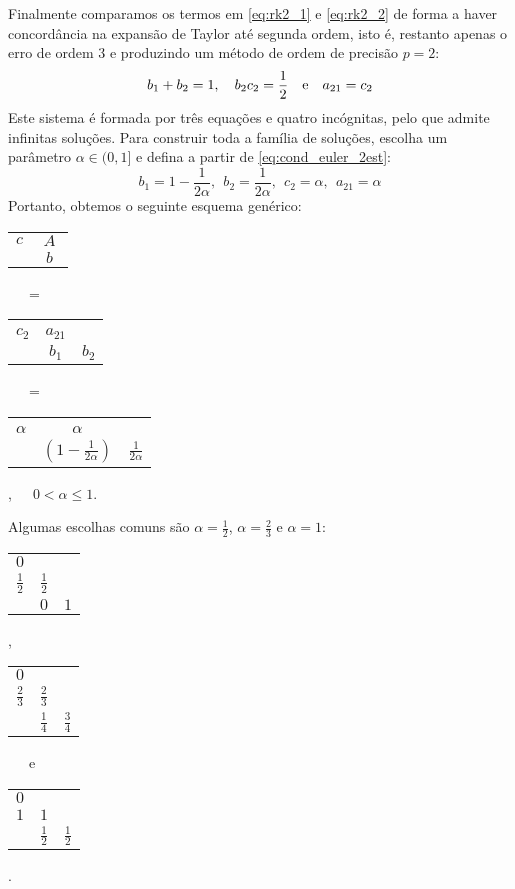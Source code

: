 Finalmente comparamos os termos em \eqref{eq:rk2_1} e \eqref{eq:rk2_2} de forma a haver concordância na expansão de Taylor até segunda ordem, isto é, restanto apenas o erro de ordem 3 e produzindo um método de ordem de precisão $p=2$:
\begin{equation}\label{eq:cond_euler_2est}
  b_1+b_2=1, \quad b_2c_2 = \frac{1}{2} \quad \hbox{e} \quad a_{21}=c_2
\end{equation}
Este sistema é formada por três equações e quatro incógnitas, pelo que admite infinitas soluções. Para construir toda a família de soluções, escolha um parâmetro $\alpha\in (0,1] $ e defina a partir de \eqref{eq:cond_euler_2est}:
\begin{equation} b_1=1-\frac{1}{2\alpha},~~b_2=\frac{1}{2\alpha},~~c_2=\alpha,~~a_{21}=\alpha  \end{equation}
Portanto, obtemos o seguinte esquema genérico:
\begin{center}
\begin{tabular}{c|cc}
  \multirow{2}{*}{$c$}    &  \multicolumn{2}{c}{\multirow{2}{*}{$A$}} 	     \\
                          &  \multicolumn{2}{c}{}                            \\
  \hline
                          & \multicolumn{2}{c}{$~~b~~$}
\end{tabular}
~~~=~~~
\begin{tabular}{c|cc}
   &   &   \\
  $c_2$ & $a_{21}$ &   \\  \hline
      & $b_1$ &$b_2$
\end{tabular}
~~~=~~~
\begin{tabular}{c|cc}
   &   &   \\
  $\alpha$ & $\alpha$ &   \\  \hline
      & $\left(1-\frac{1}{2\alpha}\right)$ &$\frac{1}{2\alpha}$
\end{tabular},~~~$0<\alpha\leq 1$.
\end{center}
 Algumas escolhas comuns são $\alpha=\frac{1}{2}$, $\alpha=\frac{2}{3}$ e $\alpha=1$:
\begin{center}
\begin{tabular}{c|cc}
  $0$ &     &   \\
  $\frac{1}{2}$ & $\frac{1}{2}$ &   \\  \hline
      & $0$ & $1$
\end{tabular},\hphantom{~~~e~~~}
\begin{tabular}{c|cc}
  $0$ &   &   \\
  $\frac{2}{3}$ & $\frac{2}{3}$ &   \\  \hline
    & $\frac{1}{4}$ & $\frac{3}{4}$
\end{tabular} ~~~e~~~
\begin{tabular}{c|cc}
  $0$ &   &   \\
  $1$ & $1$ &   \\  \hline
      & $\frac{1}{2}$ &$\frac{1}{2}$
\end{tabular}.
\end{center}
